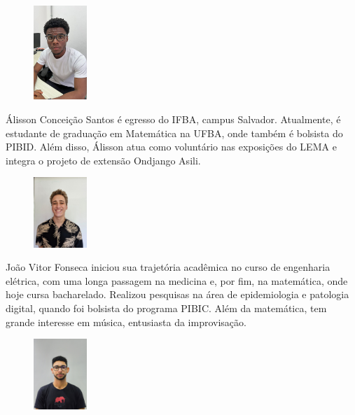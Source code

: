 \documentclass[onecolumn]{hipatia}
\begin{document}
\begin{center}
\begin{minipage}{10cm}
\vspace{0.2cm}
\begin{figure}
	\vspace{-10pt}
	\centering
	\includegraphics[width=2cm]{alisson.jpeg}
\end{figure}
Álisson Conceição Santos é egresso do IFBA, campus Salvador. Atualmente, é estudante de graduação em Matemática na UFBA, onde também é bolsista do PIBID. Além disso, Álisson atua como voluntário nas exposições do LEMA e integra o projeto de extensão Ondjango Asili. 
\end{minipage}
\begin{minipage}{10cm}
	\vspace{0.3cm}
	\begin{figure}
		\vspace{-10pt}
			\includegraphics[width=2cm]{joao.jpeg}
		\end{figure}
		João Vitor Fonseca iniciou sua trajetória acadêmica no curso de engenharia elétrica, com uma longa passagem na medicina e, por fim, na matemática, onde hoje cursa bacharelado. Realizou pesquisas na área de epidemiologia e patologia digital, quando foi bolsista do programa PIBIC. Além da matemática, tem grande interesse em música, entusiasta da improvisação.
	\end{minipage}
	\begin{minipage}{10cm}
		\vspace{0.3cm}
		\begin{figure}
			\vspace{-10pt}
				\includegraphics[width=2cm]{jose.jpeg}

\end{figure}
\end{minipage}
\end{center}
\end{document}
